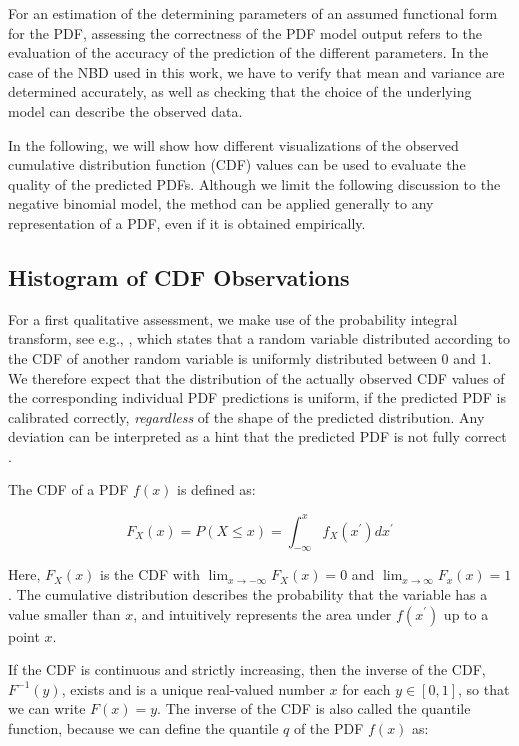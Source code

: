 \documentclass[BCOR=1mm, DIV=calc,10pt,
twoside=true,
twocolumn,
headings=normal]{scrartcl}
\begin{document}
For an estimation of the determining parameters of an assumed functional form for the PDF, assessing the correctness of the PDF model output refers to the evaluation of the accuracy of the prediction of the different parameters. In the case of the NBD used in this work, we have to verify that mean and variance are determined accurately, as well as checking that the choice of the underlying model can describe the observed data.

In the following, we will show how different visualizations of the observed cumulative distribution function (CDF) values can be used to evaluate the quality of the predicted PDFs. Although we limit the following discussion to the negative binomial model, the method can be applied generally to any representation of a PDF, even if it is obtained empirically.

\subsection{Histogram of CDF Observations}
\label{sec:cdf_histo}

For a first qualitative assessment, we make use of the probability integral transform, see e.g., \cite{Angus1994,casella2002statistical}, which states that a random variable distributed according to the CDF of another random variable is uniformly distributed between 0 and 1. We therefore expect that the distribution of the actually observed CDF values of the corresponding individual PDF predictions is uniform, if the predicted PDF is calibrated correctly, {\em regardless} of the shape of the predicted distribution. Any deviation can be interpreted as a hint that the predicted PDF is not fully correct \cite{diebold1998vevaluating}.

\noindent
The CDF of a PDF $f(x)$ is defined as:

\begin{equation}
\label{eqn:CDF}
F_X(x) = P(X \le x) = \int_{-\infty}^{x} f_X(x^\prime) dx^\prime
\end{equation}

Here, $F_X(x)$ is the CDF with $\lim_{x \to -\infty}F_X(x) = 0$ and $\lim_{x \to \infty}F_x(x) = 1$. The cumulative distribution describes the probability that the variable has a value smaller than $x$, and intuitively represents the area under $f(x^\prime)$ up to a point $x$.

If the CDF is continuous and strictly increasing, then the inverse of the CDF, $F^{-1}(y)$, exists and is a unique real-valued number $x$ for each $y \in [0,1]$, so that we can write $F(x) = y$. The inverse of the CDF is also called the quantile function, because we can define the quantile $q$ of the PDF $f(x)$ as:
\end{document}
